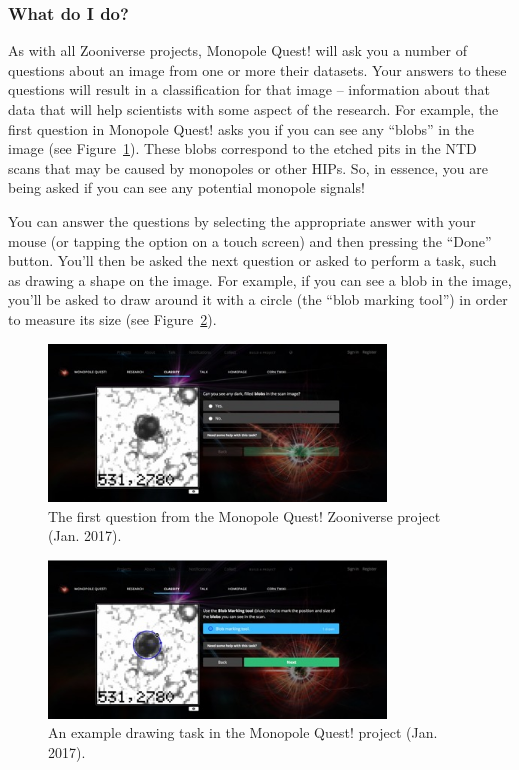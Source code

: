\subsubsection{What do I do?}
\label{sec:mqwhatdoido}
As with all Zooniverse projects, Monopole Quest! will ask you a number of
questions about an image from one or more their datasets.
Your answers to these questions will result in a classification for that
image -- information about that data that will help scientists with
some aspect of the research.
For example, the first question in Monopole Quest! asks you if you can
see any ``blobs'' in the image (see Figure~\ref{fig:mqblobq}).
These blobs correspond to the etched pits in the
\ac{NTD} scans that may be caused by monopoles or other \acp{HIP}.
So, in essence, you are being asked if you can see any potential
monopole signals!

You can answer the questions by selecting the appropriate answer with your
mouse (or tapping the option on a touch screen) and then pressing the
``Done'' button.
You'll then be asked the next question or asked to perform a task,
such as drawing a shape on the image.
For example, if you can see a blob in the image, you'll be asked to draw
around it with a circle (the ``blob marking tool'') in order to measure
its size (see Figure~\ref{fig:mqdrawing}).

%
\begin{figure}[p]
  \centering
  \includegraphics[width=0.8\textwidth]{assets/images/mqblobq/mqblobq.jpg}
  \caption[Monopole Quest! Can you see any blobs?]
  {\label{fig:mqblobq}The first question from the Monopole Quest!
Zooniverse project (Jan. 2017).}
\end{figure}
%

%
\begin{figure}[p]
  \centering
  \includegraphics[width=0.8\textwidth]{assets/images/mqdrawing/mqdrawing.jpg}
  \caption[Monopole Quest! An example drawing task]
  {\label{fig:mqdrawing}An example drawing task in the Monopole Quest! project
(Jan. 2017).}
\end{figure}
%

